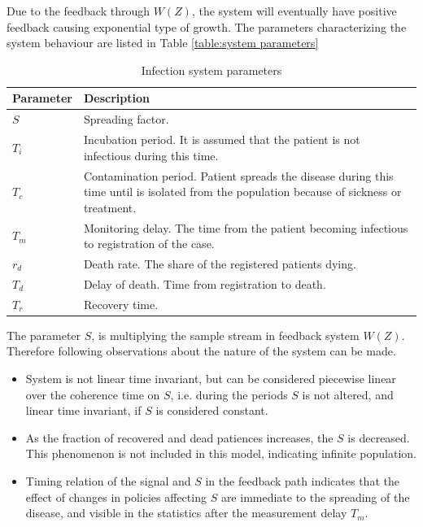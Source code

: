Due to the feedback through $W(Z)$, the system will eventually have positive
feedback causing exponential type of growth. The parameters characterizing the
system behaviour are listed in Table \ref{table:system parameters}
\begin{table}
    \centering
    \caption{Infection system parameters}
    \begin{tabular}{l|p{10cm}}
        \textbf{Parameter} & \textbf{Description} \\
        \hline
        $S$ & Spreading factor.\\
        $T_i$ & Incubation period. It is assumed that the patient is not
        infectious during this time. \\
        $T_c$ & Contamination period. Patient spreads the disease during this
        time until is isolated from the population because of sickness or
        treatment.\\
        $T_m$ & Monitoring delay. The time from the patient becoming
        infectious to registration of the case.\\
        $r_d$ & Death rate. The share of the registered patients dying.\\
        $T_d$ & Delay of death. Time from registration to death.\\
        $T_r$ & Recovery time.
    \end{tabular}
    \label{tab:system_parameters}
\end{table}

The parameter $S$, is multiplying the sample stream in feedback system
$W(Z)$. Therefore following observations about the nature of the
system can be made.
\begin{itemize}
    \item System is not linear time invariant, but can be considered piecewise
        linear over
        the coherence time on $S$, i.e. during the periods $S$ is not altered,
        and linear time invariant, if $S$ is considered constant.
    \item As the fraction of recovered and dead patiences increases, the $S$
        is decreased. This phenomenon is not included in this model,
        indicating infinite population.
    \item Timing relation of the signal and $S$ in the feedback path indicates
        that the effect of changes in policies affecting $S$ are immediate to
        the spreading of the disease, and visible in the statistics after the
        measurement delay $T_m$.
\end{itemize}

